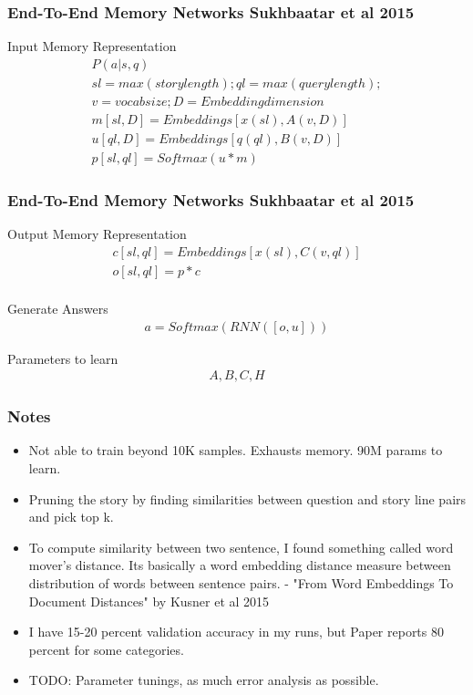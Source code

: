 \documentclass{beamer}
\begin{document}

\begin{frame}
\frametitle{End-To-End Memory Networks Sukhbaatar et al 2015}
\begin{block}{Input Memory Representation}
\begin{gather*} 
	P(a|s,q) \\
	sl = max(story length) ; ql = max(query length); \\
	v = vocab size; D = Embedding dimension \\
	m[sl,D] = Embeddings[x(sl),A(v,D)]\\ 
	u[ql,D] = Embeddings[q(ql),B(v,D)]\\ 
	p[sl,ql] = Softmax(u * m)
\end{gather*}
\end{block}
\end{frame}


\begin{frame}
\frametitle{End-To-End Memory Networks Sukhbaatar et al 2015}
\begin{block}{Output Memory Representation}
\begin{gather*}
	c[sl,ql] = Embeddings[x(sl),C(v,ql)]\\
	o[sl,ql] = p * c \\
\end{gather*}
\end{block}

\begin{block}{Generate Answers}
\begin{gather*}
	a = Softmax(RNN([o,u]))
\end{gather*}
\end{block}

\begin{block}{Parameters to learn}
\begin{gather*}
	A,B,C,H
\end{gather*}
\end{block}

\end{frame}

\begin{frame}
\frametitle{Notes}
\begin{itemize}
\item Not able to train beyond 10K samples. Exhausts memory. 90M params to learn.
\item Pruning the story by finding similarities between question and story line pairs and pick top k. 
\item To compute similarity between two sentence, I found something called word mover's distance. Its basically a word embedding distance measure between distribution of words between sentence pairs. - "From Word Embeddings To Document Distances" by Kusner et al 2015
\item I have 15-20 percent validation accuracy in my runs, but Paper reports 80 percent for some categories. 
\item TODO: Parameter tunings, as much error analysis as possible.
\end{itemize}
\end{frame}
\end{document}

